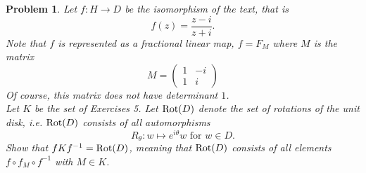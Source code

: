 \documentclass{article}
\newtheorem{problem}{Problem}
\begin{document}
\begin{problem}
Let $f : H \rightarrow D$ be the isomorphism of the text, that is
\[
f(z) = \frac{z - i}{z + i}.
\]
Note that $f$ is represented as a fractional linear map, $f = F_M$ where $M$ is the matrix
\[
M =
\left (
\begin{array}{cc}
1 & -i\\
1 & i
\end{array}
\right )
\]
Of course, this matrix does not have determinant $1$.\\
Let $K$ be the set of Exercises 5. Let $\textup{Rot}(D)$ denote the set of rotations of the unit disk, i.e. $\textup{Rot}(D)$ consists of all automorphisms
\[
\text{$R_{\theta} : w \mapsto e^{i \theta}w$ for $w \in D$.}
\]
Show that $f K f^{-1} = \textup{Rot}(D)$, meaning that $\textup{Rot}(D)$ consists of all elements $f \circ f_M \circ f^{-1}$ with $M \in K$.
\end{problem}
\end{document}
